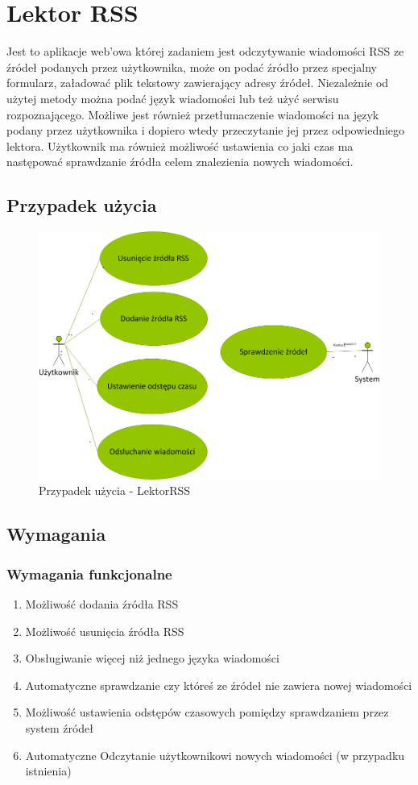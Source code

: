 \section{Lektor RSS}
Jest to aplikacje web'owa której zadaniem jest odczytywanie wiadomości RSS ze źródeł podanych przez użytkownika, może on podać źródło przez specjalny formularz, załadować plik tekstowy zawierający adresy źródeł. Niezależnie od użytej metody można podać język wiadomości lub też użyć serwisu rozpoznającego. Możliwe jest również przetłumaczenie wiadomości na język podany przez użytkownika i dopiero wtedy przeczytanie jej przez odpowiedniego lektora. Użytkownik ma również możliwość ustawienia co jaki czas ma następować sprawdzanie źródła celem znalezienia nowych wiadomości.	 
\newpage
\subsection{Przypadek użycia}
\begin{figure}[!h]
	\centering
	\includegraphics[scale=0.45]{useCaseRSS.png} 
	\caption{Przypadek użycia - LektorRSS}
\end{figure}

\subsection{Wymagania}
\subsubsection{Wymagania funkcjonalne}
\begin{enumerate}
	\item Możliwość dodania źródła RSS
	\item Możliwość usunięcia źródła RSS
	\item Obsługiwanie więcej niż jednego języka wiadomości
	\item Automatyczne sprawdzanie czy któreś ze źródeł nie zawiera nowej wiadomości
	\item Możliwość ustawienia odstępów czasowych pomiędzy sprawdzaniem przez system źródeł
	\item Automatyczne Odczytanie użytkownikowi nowych wiadomości (w przypadku istnienia) 
\end{enumerate}  
